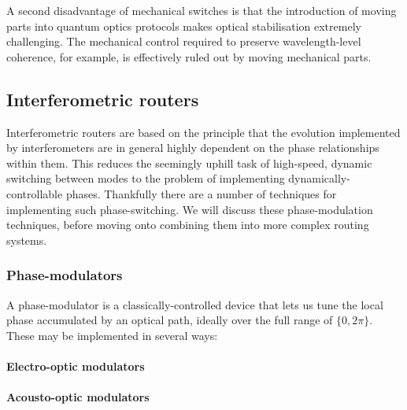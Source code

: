 A second disadvantage of mechanical switches is that the introduction of moving parts into quantum optics protocols makes optical stabilisation extremely challenging. The mechanical control required to preserve wavelength-level coherence, for example, is effectively ruled out by moving mechanical parts.

%
%

\subsection{Interferometric routers} 

Interferometric routers are based on the principle that the evolution implemented by interferometers are in general highly dependent on the phase relationships within them. This reduces the seemingly uphill task of high-speed, dynamic switching between modes to the problem of implementing dynamically-controllable phases. Thankfully there are a number of techniques for implementing such phase-switching. We will discuss these phase-modulation techniques, before moving onto combining them into more complex routing systems.

%
%

\subsubsection{Phase-modulators} 

A phase-modulator is a classically-controlled device that lets us tune the local phase accumulated by an optical path, ideally over the full range of $\{0,2\pi\}$. These may be implemented in several ways:


%
%

\paragraph{Electro-optic modulators} 



%
%

\paragraph{Acousto-optic modulators} 

